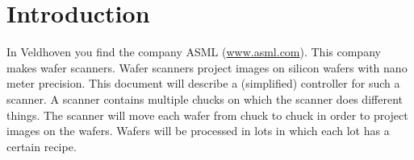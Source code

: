 \section{Introduction}
In Veldhoven you find the company ASML (\url{www.asml.com}).
This company makes wafer scanners.
Wafer scanners project images on silicon wafers with nano meter precision.
This document will describe a (simplified) controller for such a scanner.
A scanner contains multiple chucks on which the scanner does different things.
The scanner will move each wafer from chuck to chuck in order to project images on the wafers.
Wafers will be processed in lots in which each lot has a certain recipe.
